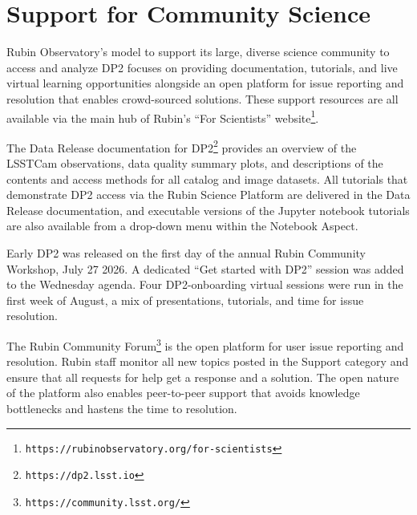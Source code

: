 \section{Support for Community Science}
\label{sec:community_science}

Rubin Observatory's model to support its large, diverse science community to access and analyze \gls{DP2} focuses on providing documentation, tutorials, and live virtual learning opportunities alongside an open platform for issue reporting and resolution that enables crowd-sourced solutions.
These support resources are all available via the main hub of Rubin's ``For Scientists'' website\footnote{\nolinkurl{https://rubinobservatory.org/for-scientists}}.

The Data \gls{Release} documentation for \gls{DP2}\footnote{\nolinkurl{https://dp2.lsst.io}} provides an overview of the \gls{LSSTCam} observations, data quality summary plots, and descriptions of the contents and access methods for all catalog and image datasets.
All tutorials \citep[][]{10.11578/rubin/dc.20250909.20} that demonstrate \gls{DP2} access via the Rubin Science Platform are delivered in the Data Release documentation, and executable versions of the Jupyter notebook tutorials are also available from a drop-down menu within the Notebook Aspect.

Early \gls{DP2} was released on the first day of the annual Rubin Community Workshop, July 27 2026.
A dedicated ``Get started with \gls{DP2}'' session was added to the Wednesday agenda.
Four \gls{DP2}-onboarding virtual sessions were run in the first week of August, a mix of presentations, tutorials, and time for issue resolution.

The Rubin Community Forum\footnote{\nolinkurl{https://community.lsst.org/}} is the open platform for user issue reporting and resolution.
Rubin staff monitor all new topics posted in the Support category and ensure that all requests for help get a response and a solution.
The open nature of the platform also enables peer-to-peer support that avoids knowledge bottlenecks and hastens the time to resolution.
